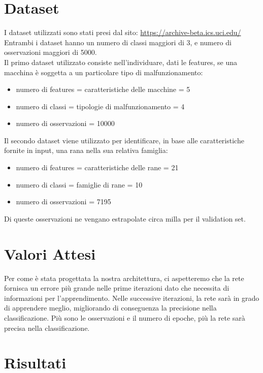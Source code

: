 \documentclass{article}
\begin{document}
    \section{Dataset}\label{sec:dataset}
        I dataset utilizzati sono stati presi dal sito: \href{https://archive-beta.ics.uci.edu/}{https://archive-beta.ics.uci.edu/} \\
        Entrambi i dataset hanno un numero di classi maggiori di 3, e numero di osservazioni maggiori di 5000. \\
        Il primo dataset utilizzato consiste nell'individuare, dati le features, se una macchina è soggetta a un particolare tipo di malfunzionamento:
        \begin{itemize}
            \item numero di features = caratteristiche delle macchine =  5
            \item numero di classi = tipologie di malfunzionamento = 4
            \item numero di osservazioni = 10000
        \end{itemize}
        Il secondo dataset viene utilizzato per identificare, in base alle caratteristiche fornite in input, una rana nella sua relativa famiglia:
        \begin{itemize}
            \item numero di features = caratteristiche delle rane = 21
            \item numero di classi = famiglie di rane = 10
            \item numero di osservazioni = 7195
        \end{itemize}
        Di queste osservazioni ne vengano estrapolate circa milla per il validation set.
    \section{Valori Attesi}\label{sec:valori-attesi}
        Per come è stata progettata la nostra architettura, ci aspetteremo che la rete fornisca un errore più grande nelle prime iterazioni dato che necessita di informazioni per l'apprendimento.
        Nelle successive iterazioni, la rete sarà in grado di apprendere meglio, migliorando di conseguenza la precisione nella classificazione.
        Più sono le osservazioni e il numero di epoche, più la rete sarà precisa nella classificazione.
    \section{Risultati}\label{sec:risultati}
\end{document}
